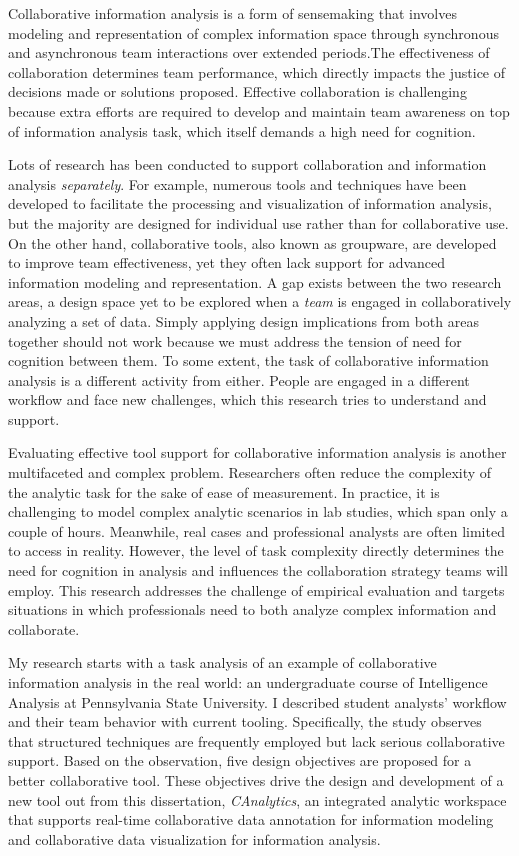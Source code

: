 
Collaborative information analysis is a form of sensemaking that involves modeling and representation of complex information space through synchronous and asynchronous team interactions over extended periods.The effectiveness of collaboration determines team performance, which directly impacts the justice of decisions made or solutions proposed. Effective collaboration is challenging because extra efforts are required to develop and maintain team awareness on top of information analysis task, which itself demands a high need for cognition.

Lots of research has been conducted to support collaboration and information analysis \textit{separately}. For example, numerous tools and techniques have been developed to facilitate the processing and visualization of information analysis, but the majority are designed for individual use rather than for collaborative use. On the other hand, collaborative tools, also known as groupware, are developed to improve team effectiveness, yet they often lack support for advanced information modeling and representation. A gap exists between the two research areas, a design space yet to be explored when a \textit{team} is engaged in collaboratively analyzing a set of data. Simply applying design implications from both areas together should not work because we must address the tension of need for cognition between them. To some extent, the task of collaborative information analysis is a different activity from either. People are engaged in a different workflow and face new challenges, which this research tries to understand and support.

Evaluating effective tool support for collaborative information analysis is another multifaceted and complex problem. Researchers often reduce the complexity of the analytic task for the sake of ease of measurement. In practice, it is challenging to model complex analytic scenarios in lab studies, which span only a couple of hours. Meanwhile, real cases and professional analysts are often limited to access in reality. However, the level of task complexity directly determines the need for cognition in analysis and influences the collaboration strategy teams will employ. This research addresses the challenge of empirical evaluation and targets situations in which professionals need to both analyze complex information and collaborate.

My research starts with a task analysis of an example of collaborative information analysis in the real world: an undergraduate course of Intelligence Analysis at Pennsylvania State University. I described student analysts' workflow and their team behavior with current tooling. Specifically, the study observes that structured techniques are frequently employed but lack serious collaborative support. Based on the observation, five design objectives are proposed for a better collaborative tool. These objectives drive the design and development of a new tool out from this dissertation, \textit{CAnalytics}, an integrated analytic workspace that supports real-time collaborative data annotation for information modeling and collaborative data visualization for information analysis. 

